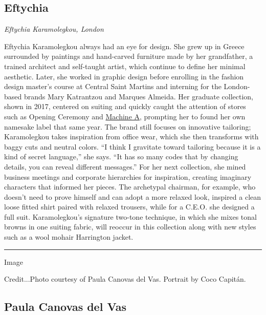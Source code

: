\hypertarget{eftychia}{%
\subsection{Eftychia}\label{eftychia}}

\emph{Eftychia Karamolegkou, London}

Eftychia Karamolegkou always had an eye for design. She grew up in
Greece surrounded by paintings and hand-carved furniture made by her
grandfather, a trained architect and self-taught artist, which continue
to define her minimal aesthetic. Later, she worked in graphic design
before enrolling in the fashion design master's course at Central Saint
Martins and interning for the London-based brands Mary Katrantzou and
Marques Almeida. Her graduate collection, shown in 2017, centered on
suiting and quickly caught the attention of stores such as Opening
Ceremony and
\href{https://www.machine-a.com/collections/designer-eftychia}{Machine
A}, prompting her to found her own namesake label that same year. The
brand still focuses on innovative tailoring; Karamolegkou takes
inspiration from office wear, which she then transforms with baggy cuts
and neutral colors. ``I think I gravitate toward tailoring because it is
a kind of secret language,'' she says. ``It has so many codes that by
changing details, you can reveal different messages.'' For her next
collection, she mined business meetings and corporate hierarchies for
inspiration, creating imaginary characters that informed her pieces. The
archetypal chairman, for example, who doesn't need to prove himself and
can adopt a more relaxed look, inspired a clean loose fitted shirt
paired with relaxed trousers, while for a C.E.O. she designed a full
suit. Karamolegkou's signature two-tone technique, in which she mixes
tonal browns in one suiting fabric, will reoccur in this collection
along with new styles such as a wool mohair Harrington jacket.

\begin{center}\rule{0.5\linewidth}{\linethickness}\end{center}

Image

Credit...Photo courtesy of Paula Canovas del Vas. Portrait by Coco
Capitán.

\hypertarget{paula-canovas-del-vas}{%
\subsection{Paula Canovas del Vas}\label{paula-canovas-del-vas}}

